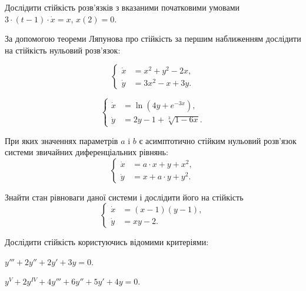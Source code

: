 \begin{problem}
	Дослідити стійкість розв'язків з вказаними початковими умовами $3 \cdot (t - 1) \cdot \dot x = x$, $x(2) = 0$.
\end{problem}

За допомогою теореми Ляпунова про стійкість за першим наближенням дослідити на стійкість нульовий розв'язок:

\begin{problem}
	\[\left\{ \begin{aligned} \dot x &= x^2 + y^2 - 2 x, \\ \dot y &= 3 x^2 - x + 3 y. \end{aligned} \right.\]
\end{problem}

\begin{problem}
	\[\left\{ \begin{aligned} \dot x &= \ln (4 y + e^{- 3 x}), \\ \dot y &= 2 y - 1 + \sqrt[3]{1 - 6 x}. \end{aligned} \right.\]
\end{problem}

\begin{problem}
	При яких значеннях параметрів $a$ i $b$ є асимптотично стійким нульовий розв'язок системи звичайних диференціальних рівнянь: 
	\[\left\{ \begin{aligned} \dot x &= a \cdot x + y + x^2, \\ \dot y &= x + a \cdot y + y^2. \end{aligned} \right.\]
\end{problem}

\begin{problem}
	Знайти стан рівноваги даної системи і дослідити його на стійкість 
	\[\left\{ \begin{aligned} \dot x &= (x - 1) (y - 1), \\ \dot y &= x y - 2. \end{aligned} \right.\]
\end{problem}

Дослідити стійкість користуючись відомими критеріями:

\begin{problem}
	$y''' + 2 y'' + 2 y' + 3 y = 0$.
\end{problem}

\begin{problem}
	$y^V + 2 y^{IV} + 4 y''' + 6 y'' + 5 y' + 4 y = 0$.
\end{problem}

